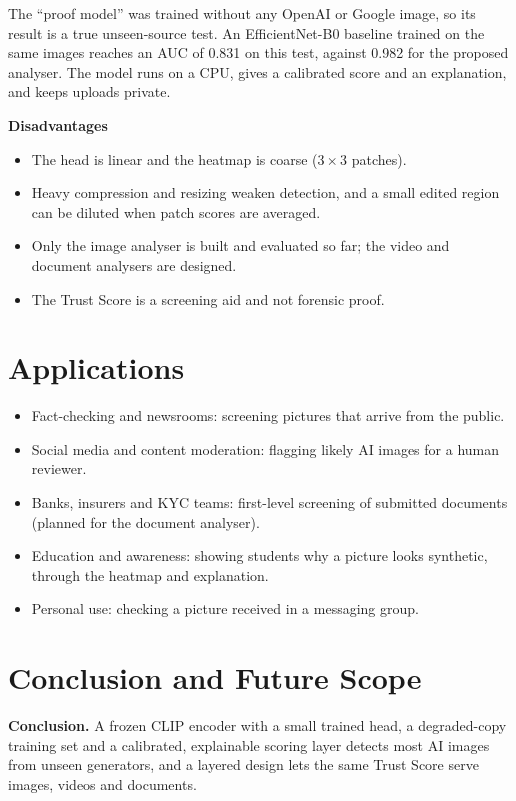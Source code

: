 \documentclass[12pt,a4paper]{article}
\begin{document}
The ``proof model'' was trained without any OpenAI or Google image, so its result is a true unseen-source test. An EfficientNet-B0 baseline trained on the same images reaches an AUC of 0.831 on this test, against 0.982 for the proposed analyser. The model runs on a CPU, gives a calibrated score and an explanation, and keeps uploads private.

\textbf{Disadvantages}
\begin{itemize}
  \item The head is linear and the heatmap is coarse ($3\times3$ patches).
  \item Heavy compression and resizing weaken detection, and a small edited region can be diluted when patch scores are averaged.
  \item Only the image analyser is built and evaluated so far; the video and document analysers are designed.
  \item The Trust Score is a screening aid and not forensic proof.
\end{itemize}

\section{Applications}
\begin{itemize}
  \item Fact-checking and newsrooms: screening pictures that arrive from the public.
  \item Social media and content moderation: flagging likely AI images for a human reviewer.
  \item Banks, insurers and KYC teams: first-level screening of submitted documents (planned for the document analyser).
  \item Education and awareness: showing students why a picture looks synthetic, through the heatmap and explanation.
  \item Personal use: checking a picture received in a messaging group.
\end{itemize}

\section{Conclusion and Future Scope}
\textbf{Conclusion.} A frozen CLIP encoder with a small trained head, a degraded-copy training set and a calibrated, explainable scoring layer detects most AI images from unseen generators, and a layered design lets the same Trust Score serve images, videos and documents.
\end{document}
